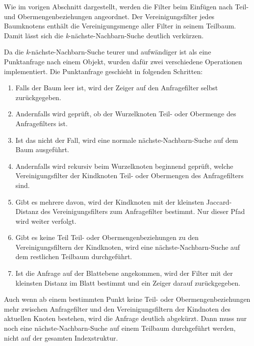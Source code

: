 Wie im vorigen Abschnitt dargestellt, werden die Filter beim Einfügen nach Teil- und Obermengenbeziehungen angeordnet. Der Vereinigungsfilter jedes Baumknotens enthält die Vereinigungsmenge aller Filter in seinem Teilbaum. Damit lässt sich die \textit{k}-nächste-Nachbarn-Suche deutlich verkürzen. 

Da die \textit{k}-nächste-Nachbarn-Suche teurer und aufwändiger ist als eine Punktanfrage nach einem Objekt, wurden dafür zwei verschiedene Operationen implementiert. Die Punktanfrage geschieht in folgenden Schritten: 
\begin{enumerate}
	\item Falls der Baum leer ist, wird der Zeiger auf den Anfragefilter selbst zurückgegeben. 
	\item Andernfalls wird geprüft, ob der Wurzelknoten Teil- oder Obermenge des Anfragefilters ist. 
	\item Ist das nicht der Fall, wird eine normale nächste-Nachbarn-Suche auf dem Baum ausgeführt. 
	\item Andernfalls wird rekursiv beim Wurzelknoten beginnend geprüft, welche Vereinigungsfilter der Kindknoten Teil- oder Obermengen des Anfragefilters sind. 
	\item Gibt es mehrere davon, wird der Kindknoten mit der kleinsten Jaccard-Distanz des Vereinigungsfilters zum Anfragefilter bestimmt. Nur dieser Pfad wird weiter verfolgt.
	\item Gibt es keine Teil Teil- oder Obermengenbeziehungen zu den Vereinigungsfiltern der Kindknoten, wird eine nächste-Nachbarn-Suche auf dem restlichen Teilbaum durchgeführt. 
	\item Ist die Anfrage auf der Blattebene angekommen, wird der Filter mit der kleinsten Distanz im Blatt bestimmt und ein Zeiger darauf zurückgegeben.  
\end{enumerate}
Auch wenn ab einem bestimmten Punkt keine Teil- oder Obermengenbeziehungen mehr zwischen Anfragefilter und den Vereinigungsfiltern der Kindnoten des aktuellen Knoten bestehen, wird die Anfrage deutlich abgekürzt. Dann muss nur noch eine nächste-Nachbarn-Suche auf einem Teilbaum durchgeführt werden, nicht auf der gesamten Indexstruktur. 

